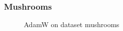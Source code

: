 \documentclass{article}
\begin{document}
\subsubsection{Mushrooms}
\begin{figure}[h]
\begin{minipage}[h]{0.5\linewidth}
\end{minipage}
\hfill
\begin{minipage}[h]{0.5\linewidth}
\end{minipage}
\caption{AdamW on dataset mushrooms}

\label{fig:m_adamw}
\end{figure}
\end{document}
